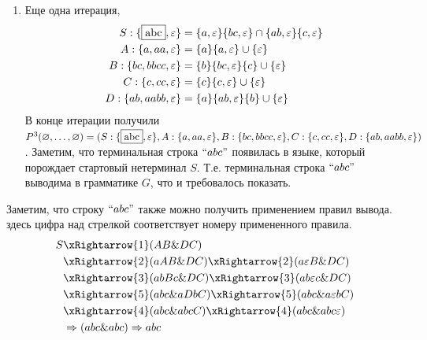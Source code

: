 \begin{example}
\begin{enumerate}
\begin{align*}
            A: \{a, \varepsilon\} &= \{a\}\{\varepsilon\} \cup \{\varepsilon\} \\
            B: \{bc, \varepsilon\} &= \{b\}\{\varepsilon\}\{c\} \cup \{\varepsilon\} \\
            C: \{c, \varepsilon\} &= \{c\}\{\varepsilon\} \cup \{\varepsilon\} \\
            D: \{ab, \varepsilon\} &= \{a\}\{\varepsilon\}\{b\} \cup \{\varepsilon\}
        \end{align*}
        В конце итерации получаем $P^{2}(\varnothing,\ldots,\varnothing) = (S: \{\varepsilon\}, A: \{a, \varepsilon\}, B: \{bc, \varepsilon\}, C: \{c, \varepsilon\}, D: \{ab, \varepsilon\})$
        \item Еще одна итерация,
        \begin{align*}
            S:  \{\fbox{abc}, \varepsilon\} &= \{a, \varepsilon\}\{bc, \varepsilon\} \cap \{ab, \varepsilon\}\{c, \varepsilon\} \\
            A: \{a, aa, \varepsilon\} &= \{a\}\{a, \varepsilon\} \cup \{\varepsilon\} \\
            B: \{bc, bbcc, \varepsilon\} &= \{b\}\{bc, \varepsilon\}\{c\} \cup \{\varepsilon\} \\
            C: \{c, cc, \varepsilon\} &= \{c\}\{c, \varepsilon\} \cup \{\varepsilon\} \\
            D: \{ab, aabb, \varepsilon\} &= \{a\}\{ab, \varepsilon\}\{b\} \cup \{\varepsilon\}
        \end{align*}
        В конце итерации получили $P^{3}(\varnothing,\ldots,\varnothing) = (S: \{\fbox{abc}, \varepsilon\}, A: \{a, aa, \varepsilon\}, B: \{bc, bbcc, \varepsilon\}, C: \{c, cc, \varepsilon\}, D: \{ab, aabb, \varepsilon\})$. Заметим, что терминальная строка $``abc"$ появилась в языке, который порождает стартовый нетерминал $S$. Т.е. терминальная строка $``abc"$ выводима в грамматике $G$, что и требовалось показать.
    \end{enumerate}

    Заметим, что строку $``abc"$ также можно получить применением правил вывода. здесь цифра над стрелкой соответствует номеру примененного правила.
    \begin{align*}
        S &\xRightarrow{1}(AB\&DC) \\
        &\xRightarrow{2}(aAB\&DC) \xRightarrow{2} (a\varepsilon B\&DC) \\
        &\xRightarrow{3}(abBc\&DC) \xRightarrow{3}(ab\varepsilon c\&DC) \\
        &\xRightarrow{5}(abc\&aDbC) \xRightarrow{5}(abc\&a\varepsilon bC) \\
        &\xRightarrow{4}(abc\&abcC) \xRightarrow{4}(abc\&abc\varepsilon) \\
        &\Rightarrow(abc\&abc) \Rightarrow abc
    \end{align*}
\end{example}
